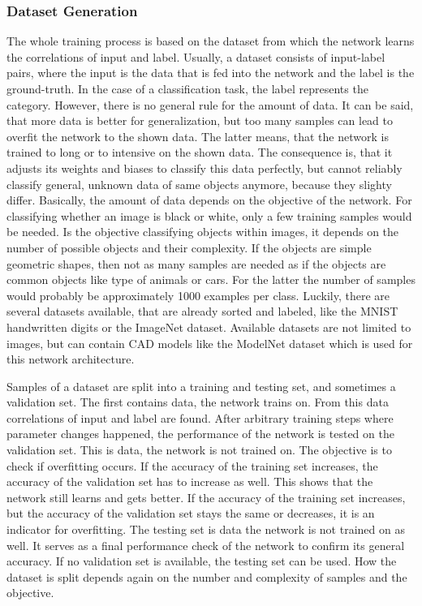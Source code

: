 \subsubsection{Dataset Generation}
\label{sec:dataset-generation}
The whole training process is based on the dataset from which the network learns the correlations of input and label.
Usually, a dataset consists of input-label pairs, where the input is the data that is fed into the network and the label is the ground-truth.
In the case of a classification task, the label represents the category.
However, there is no general rule for the amount of data.
It can be said, that more data is better for generalization, but too many samples can lead to overfit the network to the shown data.
The latter means, that the network is trained to long or to intensive on the shown data.
The consequence is, that it adjusts its weights and biases to classify this data perfectly, but cannot reliably classify general, unknown data of same objects anymore, because they slighty differ.
Basically, the amount of data depends on the objective of the network.
For classifying whether an image is black or white, only a few training samples would be needed.
Is the objective classifying objects within images, it depends on the number of possible objects and their complexity.
If the objects are simple geometric shapes, then not as many samples are needed as if the objects are common objects like type of animals or cars.
For the latter the number of samples would probably be approximately 1000 examples per class.
Luckily, there are several datasets available, that are already sorted and labeled, like the MNIST handwritten digits or the ImageNet dataset.
Available datasets are not limited to images, but can contain CAD models like the ModelNet dataset which is used for this network architecture.

Samples of a dataset are split into a training and testing set, and sometimes a validation set\cite{James2014}.
The first contains data, the network trains on.
From this data correlations of input and label are found.
After arbitrary training steps where parameter changes happened, the performance of the network is tested on the validation set.
This is data, the network is not trained on.
The objective is to check if overfitting occurs.
If the accuracy of the training set increases, the accuracy of the validation set has to increase as well.
This shows that the network still learns and gets better.
If the accuracy of the training set increases, but the accuracy of the validation set stays the same or decreases, it is an indicator for overfitting.
The testing set is data the network is not trained on as well.
It serves as a final performance check of the network to confirm its general accuracy.
If no validation set is available, the testing set can be used.
How the dataset is split depends again on the number and complexity of samples and the objective.

